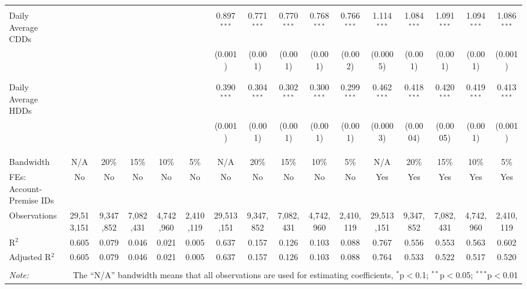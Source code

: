 \begin{table}[!htbp]
\begin{adjustbox}{scale = 0.8}
\begin{tabular}{@{\extracolsep{-7pt}}lccccccccccccccc}
  & & & & & & & & & & & & & & & \\   
 Daily Average CDDs &  &  &  &  &  & 0.897$^{***}$ & 0.771$^{***}$ & 0.770$^{***}$ & 0.768$^{***}$ & 0.766$^{***}$ & 1.114$^{***}$ & 1.084$^{***}$ & 1.091$^{***}$ & 1.094$^{***}$ & 1.086$^{***}$ \\ 
  &  &  &  &  &  & (0.001) & (0.001) & (0.001) & (0.001) & (0.002) & (0.0005) & (0.001) & (0.001) & (0.001) & (0.001) \\ 
  & & & & & & & & & & & & & & & \\ 
  & & & & & & & & & & & & & & & \\ 
 Daily Average HDDs &  &  &  &  &  & 0.390$^{***}$ & 0.304$^{***}$ & 0.302$^{***}$ & 0.300$^{***}$ & 0.299$^{***}$ & 0.462$^{***}$ & 0.418$^{***}$ & 0.420$^{***}$ & 0.419$^{***}$ & 0.413$^{***}$ \\ 
  &  &  &  &  &  & (0.001) & (0.001) & (0.001) & (0.001) & (0.001) & (0.0003) & (0.0004) & (0.0005) & (0.001) & (0.001) \\ 
  & & & & & & & & & & & & & & & \\ 
  & & & & & & & & & & & & & & & \\ 
\hline \\[-1.8ex] 
Bandwidth & N/A & 20\% & 15\% & 10\% & 5\% & N/A & 20\% & 15\% & 10\% & 5\% & N/A & 20\% & 15\% & 10\% & 5\% \\ 
FEs: Account-Premise IDs & No & No & No & No & No & No & No & No & No & No & Yes & Yes & Yes & Yes & Yes \\ 
Observations & 29,513,151 & 9,347,852 & 7,082,431 & 4,742,960 & 2,410,119 & 29,513,151 & 9,347,852 & 7,082,431 & 4,742,960 & 2,410,119 & 29,513,151 & 9,347,852 & 7,082,431 & 4,742,960 & 2,410,119 \\ 
R$^{2}$ & 0.605 & 0.079 & 0.046 & 0.021 & 0.005 & 0.637 & 0.157 & 0.126 & 0.103 & 0.088 & 0.767 & 0.556 & 0.553 & 0.563 & 0.602 \\ 
Adjusted R$^{2}$ & 0.605 & 0.079 & 0.046 & 0.021 & 0.005 & 0.637 & 0.157 & 0.126 & 0.103 & 0.088 & 0.764 & 0.533 & 0.522 & 0.517 & 0.520 \\ 
\hline 
\hline \\[-1.8ex] 
\textit{Note:}  & \multicolumn{15}{r}{The ``N/A'' bandwidth means that all observations are used for estimating coefficients, $^{*}$p$<$0.1; $^{**}$p$<$0.05; $^{***}$p$<$0.01} \\ 
\end{tabular} 

\end{adjustbox}

\end{table} 
